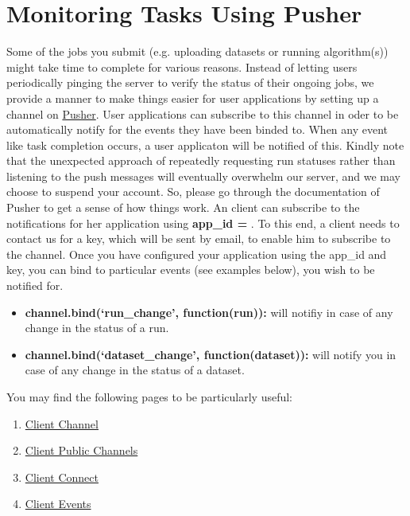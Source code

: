 \documentclass[a4paper,10pt]{scrartcl}
\begin{document}
\section{Monitoring Tasks Using Pusher}
Some of the jobs you submit (e.g. uploading datasets or running algorithm(s)) might take time to complete
for various reasons. Instead of letting users periodically pinging the server to verify the status of their
ongoing jobs, we provide a manner to make things easier for user applications by setting up a channel on \href{https://pusher.com/}{Pusher}.
User applications can subscribe to this channel in oder to be automatically notify for the events they have been binded to.
When any event like task completion occurs, a user applicaton will be notified of this. Kindly note that the unexpected
approach of repeatedly requesting run statuses rather than listening to the push messages will eventually overwhelm our 
server, and we may choose to suspend your account. So, please go through the documentation of Pusher to get a sense of how
things work. An client can subscribe to the notifications for her application using \textbf{app\_id = }.
To this end, a client needs to contact us for a key, which will be sent by email, to enable him to subscribe to the channel. Once you 
have configured your application using the app\_id and key, you can bind to particular events (see examples below), you wish to be notified for.

\begin{itemize}
 \item \textbf{channel.bind(`run\_change', function(run){}):} will notifiy in case of any change in the status of a run.
 \item \textbf{channel.bind(`dataset\_change', function(dataset){}):} will notify you in case of any change in the status of a dataset. 
\end{itemize}
You may find the following pages to be particularly useful:
\begin{enumerate}
 \item \href{https://pusher.com/docs/client_api_guide/client_channels}{Client Channel}
 \item \href{https://pusher.com/docs/client_api_guide/client_public_channels}{Client Public Channels}
 \item \href{https://pusher.com/docs/client_api_guide/client_connect}{Client Connect}
 \item \href{https://pusher.com/docs/client_api_guide/client_events}{Client Events}
\end{enumerate}
\end{document}
